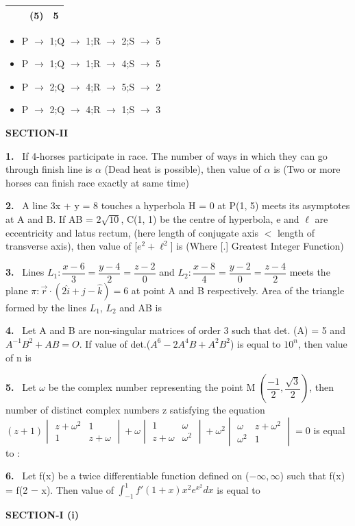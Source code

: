 \documentclass[10pt]{extarticle}
\newcommand{\papersec}[1]{\par\bigskip{\centering\Large\bfseries PAPER-#1\par}\medskip}
\newcommand{\partsec}[2]{\par\medskip\noindent{\large\bfseries PART-#1: #2}\par\smallskip}
\newcommand{\sect}[1]{\par\smallskip\noindent\textbf{#1}\par}
\newcommand{\qn}[1]{\par\smallskip\noindent\textbf{#1.}~}
\newenvironment{qoptions}{\begin{itemize}[leftmargin=1.8em,itemsep=1pt,topsep=2pt,label={}]}{\end{itemize}}
\newcommand{\opt}[2]{\item[(#1)] #2}
\begin{document}
\begin{multicols}{2}
{\begin{tabular}{|c|L{4.5cm}|c|L{0.5cm}|}
 & & (5) & 5\\ \hline
\end{tabular}}\par
\begin{qoptions}
\opt{A}{P $\rightarrow$ 1;Q $\rightarrow$ 1;R $\rightarrow$ 2;S $\rightarrow$ 5}
\opt{B}{P $\rightarrow$ 1;Q $\rightarrow$ 1;R $\rightarrow$ 4;S $\rightarrow$ 5}
\opt{C}{P $\rightarrow$ 2;Q $\rightarrow$ 4;R $\rightarrow$ 5;S $\rightarrow$ 2}
\opt{D}{P $\rightarrow$ 2;Q $\rightarrow$ 4;R $\rightarrow$ 1;S $\rightarrow$ 3}
\end{qoptions}
\sect{SECTION-II}
\qn{1} If 4-horses participate in race. The number of ways in which they can go through finish line is $\alpha$ (Dead heat is possible), then value of $\alpha$ is (Two or more horses can finish race exactly at same time)
\qn{2} A line 3x + y = 8 touches a hyperbola H = 0 at P(1, 5) meets its asymptotes at A and B. If AB = $2\sqrt{10}$, C(1, 1) be the centre of hyperbola, e and $\ell$ are eccentricity and latus rectum, (here length of conjugate axis $<$ length of transverse axis), then value of [$e^2+\ell^2$] is (Where [.] Greatest Integer Function)
\qn{3} Lines $L_1:\dfrac{x-6}{3}=\dfrac{y-4}{2}=\dfrac{z-2}{0}$ and $L_2:\dfrac{x-8}{4}=\dfrac{y-2}{0}=\dfrac{z-4}{2}$ meets the plane $\pi:\vec r\cdot(2\hat i+\hat j-\hat k)=6$ at point A and B respectively. Area of the triangle formed by the lines $L_1$, $L_2$ and AB is
\qn{4} Let A and B are non-singular matrices of order 3 such that det. (A) = 5 and $A^{-1}B^2+AB=O$. If value of det.($A^6-2A^4B+A^2B^2$) is equal to $10^n$, then value of n is
\qn{5} Let $\omega$ be the complex number representing the point M $\left(\dfrac{-1}{2},\dfrac{\sqrt3}{2}\right)$, then number of distinct complex numbers z satisfying the equation $(z+1)\begin{vmatrix}z+\omega^2&1\\1&z+\omega\end{vmatrix}+\omega\begin{vmatrix}1&\omega\\z+\omega&\omega^2\end{vmatrix}+\omega^2\begin{vmatrix}\omega&z+\omega^2\\\omega^2&1\end{vmatrix}=0$ is equal to :
\qn{6} Let f(x) be a twice differentiable function defined on ($-\infty,\infty$) such that f(x) = f(2 $-$ x). Then value of $\displaystyle\int_{-1}^1f'(1+x)x^2e^{x^2}dx$ is equal to
\raggedcolumns
\papersec{2}
\partsec{1}{PHYSICS}
\sect{SECTION-I (i)}

\end{multicols}
\end{document}
